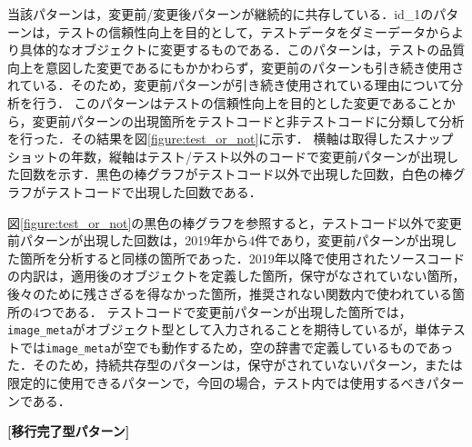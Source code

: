 \documentclass[11pt]{jreport}
\begin{document}
当該パターンは，変更前/変更後パターンが継続的に共存している．id\_1のパターンは，テストの信頼性向上を目的として，テストデータをダミーデータからより具体的なオブジェクトに変更するものである．このパターンは，テストの品質向上を意図した変更であるにもかかわらず，変更前のパターンも引き続き使用されている．そのため，変更前パターンが引き続き使用されている理由について分析を行う．
このパターンはテストの信頼性向上を目的とした変更であることから，変更前パターンの出現箇所をテストコードと非テストコードに分類して分析を行った．その結果を図\ref{figure:test_or_not}に示す．
横軸は取得したスナップショットの年数，縦軸はテスト/テスト以外のコードで変更前パターンが出現した回数を示す．黒色の棒グラフがテストコード以外で出現した回数，白色の棒グラフがテストコードで出現した回数である．

図\ref{figure:test_or_not}の黒色の棒グラフを参照すると，テストコード以外で変更前パターンが出現した回数は，2019年から4件であり，変更前パターンが出現した箇所を分析すると同様の箇所であった．2019年以降で使用されたソースコードの内訳は，適用後のオブジェクトを定義した箇所，保守がなされていない箇所，後々のために残さざるを得なかった箇所，推奨されない関数内で使われている箇所の4つである．
テストコードで変更前パターンが出現した箇所では，\texttt{image\_meta}がオブジェクト型として入力されることを期待しているが，単体テストでは\texttt{image\_meta}が空でも動作するため，空の辞書で定義しているものであった．そのため，持続共存型のパターンは，保守がされていないパターン，または限定的に使用できるパターンで，今回の場合，テスト内では使用するべきパターンである．

\noindent\textbf{[移行完了型パターン] }
\end{document}
